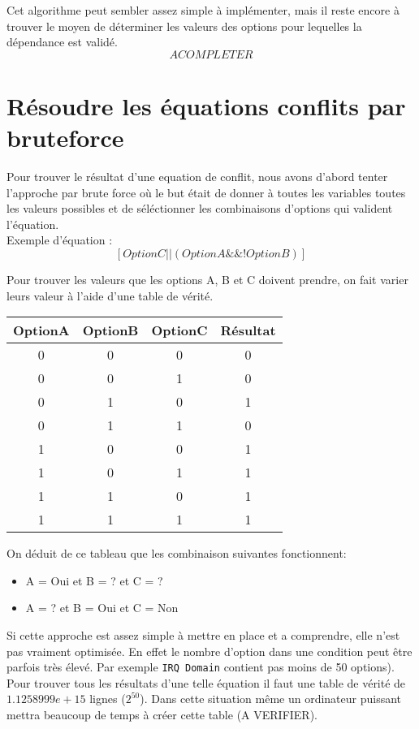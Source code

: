 \documentclass[16pts]{report}
\begin{document}
Cet algorithme peut sembler assez simple à implémenter, mais il reste encore
à trouver le moyen de déterminer les valeurs des options pour lequelles la
dépendance est validé.\\

\[A COMPLETER\]

\section{Résoudre les équations conflits par bruteforce}
\label{sec:Résoudre les équations conflits par bruteforce}

Pour trouver le résultat d'une equation de conflit, nous avons d'abord tenter
l'approche par brute force où le but était de donner à toutes les variables
toutes les valeurs possibles et de séléctionner les combinaisons d'options qui
valident l'équation.  \\

Exemple d'équation :
\[[OptionC || (OptionA \&\& !OptionB)]\]

Pour trouver les valeurs que les options A, B et C doivent prendre, on fait
varier leurs valeur à l'aide d'une table de vérité.  \\
\begin{tabular}{|c|c|c||c|}
    \hline
    OptionA & OptionB & OptionC & Résultat\\
    \hline
    \hline
    0 & 0 & 0 & 0\\
    \hline
    0 & 0 & 1 & 0\\
    \hline
    0 & 1 & 0 & 1\\
    \hline
    0 & 1 & 1 & 0\\
    \hline
    1 & 0 & 0 & 1\\
    \hline
    1 & 0 & 1 & 1\\
    \hline
    1 & 1 & 0 & 1\\
    \hline
    1 & 1 & 1 & 1\\
    \hline
\end{tabular}

On déduit de ce tableau que les combinaison suivantes fonctionnent:
\begin{itemize}
    \item A = Oui et B = ?   et C = ?   \\
    \item A = ?   et B = Oui et C = Non \\
\end{itemize}

Si cette approche est assez simple à mettre en place et a comprendre, elle
n'est pas vraiment optimisée. En effet le nombre d'option dans une condition
peut être parfois très élevé. Par exemple \verb|IRQ Domain| contient pas
moins de 50 options).\\
Pour trouver tous les résultats d'une telle équation il faut une table
de vérité de $1.1258999e+15$ lignes ($2^{50}$). Dans cette situation même
un ordinateur puissant mettra beaucoup de temps à créer cette table (A
VERIFIER).
\end{document}
